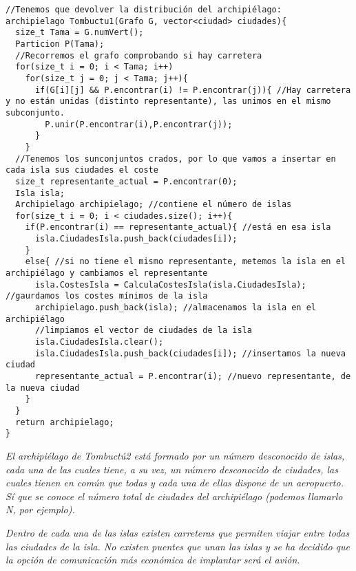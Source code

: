 \begin{verbatim}
//Tenemos que devolver la distribución del archipiélago:
archipielago Tombuctu1(Grafo G, vector<ciudad> ciudades){
  size_t Tama = G.numVert();
  Particion P(Tama);
  //Recorremos el grafo comprobando si hay carretera
  for(size_t i = 0; i < Tama; i++)
    for(size_t j = 0; j < Tama; j++){
      if(G[i][j] && P.encontrar(i) != P.encontrar(j)){ //Hay carretera y no están unidas (distinto representante), las unimos en el mismo subconjunto.
        P.unir(P.encontrar(i),P.encontrar(j));
      }
    }
  //Tenemos los sunconjuntos crados, por lo que vamos a insertar en cada isla sus ciudades el coste
  size_t representante_actual = P.encontrar(0);
  Isla isla;
  Archipielago archipielago; //contiene el número de islas
  for(size_t i = 0; i < ciudades.size(); i++){
    if(P.encontrar(i) == representante_actual){ //está en esa isla
      isla.CiudadesIsla.push_back(ciudades[i]);
    }
    else{ //si no tiene el mismo representante, metemos la isla en el archipiélago y cambiamos el representante
      isla.CostesIsla = CalculaCostesIsla(isla.CiudadesIsla); //gaurdamos los costes mínimos de la isla
      archipielago.push_back(isla); //almacenamos la isla en el archipiélago
      //limpiamos el vector de ciudades de la isla
      isla.CiudadesIsla.clear();
      isla.CiudadesIsla.push_back(ciudades[i]); //insertamos la nueva ciudad
      representante_actual = P.encontrar(i); //nuevo representante, de la nueva ciudad      
    }
  }
  return archipielago;
}

\end{verbatim}

\textbf{\large{}}\textit{ El archipiélago de Tombuctú2 está formado por un número desconocido de islas, cada una de las cuales tiene, a su vez, un número desconocido de ciudades, las cuales tienen en común que todas y cada una de ellas dispone de un aeropuerto. Sí que se conoce el número total de ciudades del archipiélago (podemos llamarlo N, por ejemplo).}

\textit{Dentro de cada una de las islas existen carreteras que permiten viajar entre todas las ciudades de la isla. No existen puentes que unan las islas y se ha decidido que la opción de comunicación más económica de implantar será el avión.}

